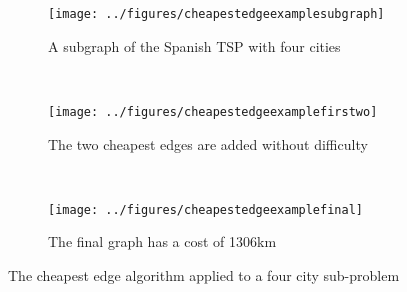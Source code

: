 \begin{figure}[h]\centering
    \begin{subfigure}[b]{0.3\textwidth}
        \texttt{[image: ../figures/cheapestedgeexamplesubgraph]}
        \caption{A subgraph of the Spanish TSP  with four cities}
        \label{fig:examplesubgraph}
    \end{subfigure}
    ~ %
    \begin{subfigure}[b]{0.3\textwidth}
        \texttt{[image: ../figures/cheapestedgeexamplefirstwo]}
        \caption{The two cheapest edges are added without difficulty}
        \label{fig:examplefirstwo}
    \end{subfigure}
    ~ %
    \begin{subfigure}[b]{0.3\textwidth}
        \texttt{[image: ../figures/cheapestedgeexamplefinal]}
        \caption{The final graph has a cost of 1306km}
        \label{fig:examplefinal}
    \end{subfigure}
    \caption{The cheapest edge algorithm applied to a four city sub-problem}\label{fig:cheapestedgeexample}
\end{figure}

